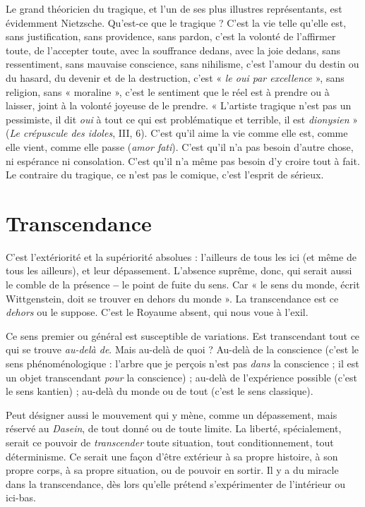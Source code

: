 Le grand théoricien du tragique, et l’un de ses plus illustres représentants,
est évidemment Nietzsche. Qu'est-ce que le tragique ? C’est la vie telle qu’elle
est, sans justification, sans providence, sans pardon, c’est la volonté de
l’affirmer toute, de l’accepter toute, avec la souffrance dedans, avec la joie
dedans, sans ressentiment, sans mauvaise conscience, sans nihilisme, c’est
l'amour du destin ou du hasard, du devenir et de la destruction, c’est « {\it le oui
par excellence} », sans religion, sans « moraline », c’est le sentiment que le réel est
à prendre ou à laisser, joint à la volonté joyeuse de le prendre. « L'artiste tragique
n’est pas un pessimiste, il dit {\it oui} à tout ce qui est problématique et terrible,
il est {\it dionysien} » ({\it Le crépuscule des idoles}, III, 6). C’est qu’il aime la vie
comme elle est, comme elle vient, comme elle passe ({\it amor fati}). C’est qu’il n’a
pas besoin d’autre chose, ni espérance ni consolation. C’est qu’il n’a même pas
besoin d’y croire tout à fait. Le contraire du tragique, ce n’est pas le comique,
c’est l’esprit de sérieux.

\section{Transcendance}
C'est l’extériorité et la supériorité absolues : l’ailleurs
de tous les ici (et même de tous les ailleurs), et leur
dépassement. L'absence suprême, donc, qui serait aussi le comble de la présence
{\bf --} le point de fuite du sens. Car « le sens du monde, écrit Wittgenstein,
doit se trouver en dehors du monde ». La transcendance est ce {\it dehors} ou le suppose.
C’est le Royaume absent, qui nous voue à l’exil.

Ce sens premier ou général est susceptible de variations. Est transcendant
tout ce qui se trouve {\it au-delà de}. Mais au-delà de quoi ? Au-delà de la conscience
(c’est le sens phénoménologique : l'arbre que je perçois n’est pas {\it dans} la
conscience ; il est un objet transcendant {\it pour} la conscience) ; au-delà de l’expérience
possible (c’est le sens kantien) ; au-delà du monde ou de tout (c’est le
sens classique).

Peut désigner aussi le mouvement qui y mène, comme un dépassement,
mais réservé au {\it Dasein}, de tout donné ou de toute limite. La liberté, spécialement,
serait ce pouvoir de {\it transcender} toute situation, tout conditionnement,
tout déterminisme. Ce serait une façon d’être extérieur à sa propre histoire, à
son propre corps, à sa propre situation, ou de pouvoir en sortir. Il y a du
miracle dans la transcendance, dès lors qu’elle prétend s’expérimenter de l’intérieur
ou ici-bas.

